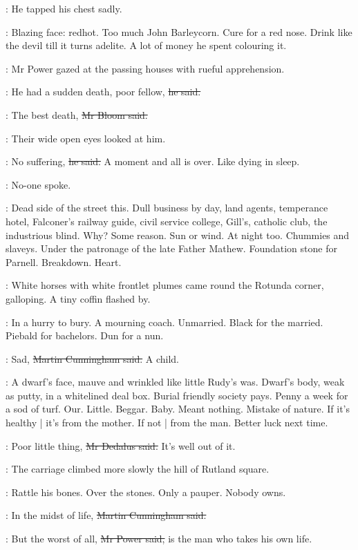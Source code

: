 :
He tapped his chest sadly.

\BloomInt:
Blazing face:
redhot.
Too much John Barleycorn.
Cure for a red nose.
Drink like the devil till it turns adelite.
A lot of money he spent colouring it.

:
Mr Power gazed at the passing houses
with rueful apprehension.

\power:
He had a sudden death, poor fellow,
\sout{he said.}

\Bloom:
The best death,
\sout{Mr Bloom said.}

:
Their wide open eyes looked at him.

\Bloom:
No suffering,
\sout{he said.}
A moment and all is over.
Like dying in sleep.

:
No-one spoke.

\BloomInt:
Dead side of the street this.
Dull business by day,
land agents, temperance hotel,
Falconer's railway guide, civil service college,
Gill's, catholic club, the industrious blind.
Why?
Some reason.
Sun or wind.
At night too.
Chummies and slaveys.
Under the patronage of the late Father Mathew.
Foundation stone for Parnell.
Breakdown.
Heart.

:
White horses with white frontlet plumes came round the Rotunda corner,
galloping.
A tiny coffin flashed by.

\BloomInt:
In a hurry to bury.
A mourning coach.
Unmarried.
Black for the married.
Piebald for bachelors.
Dun for a nun.

\cunningham:
Sad,
\sout{Martin Cunningham said.}
A child.

\BloomInt:
A dwarf's face, mauve and wrinkled like little Rudy's was.
Dwarf's body, weak as putty, in a whitelined deal box.
Burial friendly society pays.
Penny a week for a sod of turf.
Our.
Little.
Beggar.
Baby.
Meant nothing.
Mistake of nature.
If it's healthy |
it's from the mother.
If not |
from the man.
Better luck
next time.

\simon:
Poor little thing,
\sout{Mr Dedalus said.}
It's well out of it.

:
The carriage climbed more slowly the hill of Rutland square.

\BloomInt:
Rattle his bones.
Over the stones.
Only a pauper.
Nobody owns.

\cunningham:
In the midst of life,
\sout{Martin Cunningham said.}

\power:
But the worst of all,
\sout{Mr Power said,}
is the man who takes his own life.

